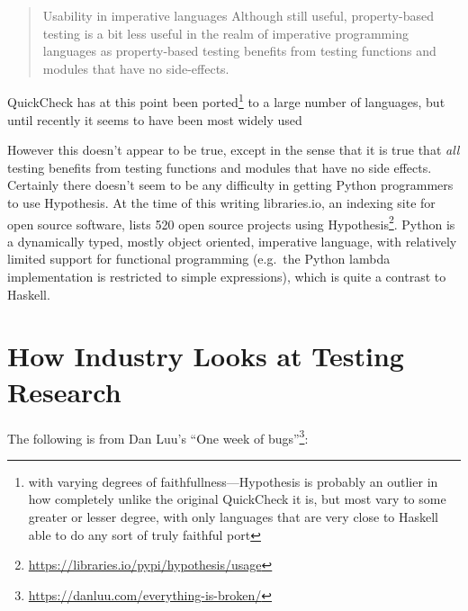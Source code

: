 \begin{quote}
Usability in imperative languages Although still useful, property-based testing is a
bit less useful in the realm of imperative programming languages as property-based testing
benefits from testing functions and modules that have no side-effects.
\end{quote}

QuickCheck has at this point been ported\footnote{with varying degrees of faithfullness---Hypothesis
is probably an outlier in how completely unlike the original QuickCheck it is,
but most vary to some greater or lesser degree,
with only languages that are very close to Haskell able to do any sort of truly faithful port} to a large number of languages,
but until recently it seems to have been most widely used

However this doesn't appear to be true,
except in the sense that it is true that \emph{all} testing benefits from testing functions and modules that have no side effects.
Certainly there doesn't seem to be any difficulty in getting Python programmers to use Hypothesis.
At the time of this writing libraries.io, an indexing site for open source software,
lists 520 open source projects using Hypothesis\footnote{\url{https://libraries.io/pypi/hypothesis/usage}}.
Python is a dynamically typed, mostly object oriented, imperative language,
with relatively limited support for functional programming (e.g.\ the Python lambda implementation is restricted to simple expressions),
which is quite a contrast to Haskell.

\chapter{How Industry Looks at Testing Research}

The following is from Dan Luu's ``One week of bugs''\footnote{\url{https://danluu.com/everything-is-broken/}}:

